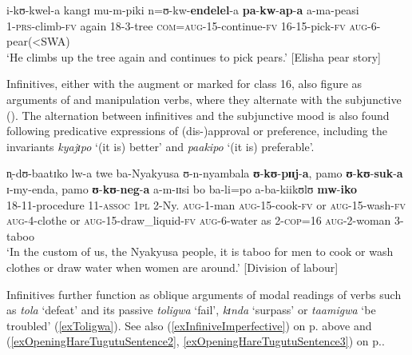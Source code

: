 \begin{exe}
\ex \label{exInfinitive16Aspectualizer}
\gll i-kʊ-kwel-a kangɪ mu-m-piki n=ʊ-kw-\textbf{endelel}-a \textbf{pa}-\textbf{kw}-\textbf{ap}-\textbf{a} a-ma-peasi\\
1-\textsc{prs}-climb-\textsc{fv} again 18-3-tree \textsc{com}=\textsc{aug}-15-continue-\textsc{fv} 16-15-pick-\textsc{fv} \textsc{aug}-6-pear(<SWA)\\
\glt \lq He climbs up the tree again and continues to pick pears.' [Elisha pear story]
\end{exe}

Infinitives, either with the augment or marked for  class 16, also figure as arguments of  and manipulation verbs, where they alternate with the subjunctive (). The alternation between infinitives and the subjunctive mood is also found following predicative expressions of (dis-)approval or preference, including the invariants \textit{kyajɪpo} \lq (it is) better' and \textit{paakipo} \lq (it is) preferable'.

\begin{exe}
\ex \label{exInfinitiveApproval} \gll n̩-dʊ-baatɪko lw-a twe ba-Nyakyusa ʊ-n-nyambala \textbf{ʊ}-\textbf{kʊ}-\textbf{pɪɪj}-\textbf{a}, pamo \textbf{ʊ}-\textbf{kʊ}-\textbf{suk}-\textbf{a} ɪ-my-enda, pamo \textbf{ʊ}-\textbf{kʊ}-\textbf{neg}-\textbf{a} a-m-ɪɪsi bo ba-li=po a-ba-kiikʊlʊ \textbf{mw}-\textbf{iko}\\
18-11-procedure 11-\textsc{assoc} \textsc{1pl} 2-Ny. \textsc{aug}-1-man \textsc{aug}-15-cook-\textsc{fv} or \textsc{aug}-15-wash-\textsc{fv} \textsc{aug}-4-clothe or \textsc{aug}-15-draw\_liquid-\textsc{fv} \textsc{aug}-6-water as 2-\textsc{cop}=16 \textsc{aug}-2-woman 3-taboo\\
\glt \lq  In the custom of us, the Nyakyusa people, it is taboo for men to cook or wash clothes or draw water when women are around.' [Division of labour]
\end{exe}

Infinitives further function as oblique arguments of modal readings of verbs such as \textit{tola} \lq  defeat' and its passive \textit{toligwa} \lq fail', \textit{kɪnda} \lq surpass' or \textit{taamigwa} \lq be troubled' (\ref{exToligwa}). See also (\ref{exInfiniveImperfective}) on p.\nobreakspace\pageref{exInfiniveImperfective} above and (\ref{exOpeningHareTugutuSentence2}, \ref{exOpeningHareTugutuSentence3}) on p.\nobreakspace\pageref{exOpeningHareTugutuSentence2}.

